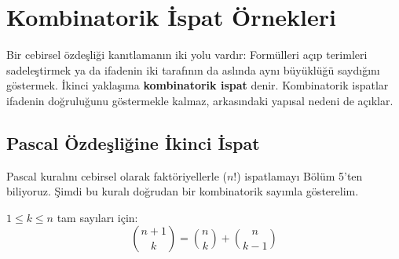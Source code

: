 \begin{center}
\end{center}

\section{Kombinatorik İspat Örnekleri}

Bir cebirsel özdeşliği kanıtlamanın iki yolu vardır: Formülleri açıp terimleri sadeleştirmek ya da ifadenin iki tarafının da aslında aynı büyüklüğü saydığını göstermek. İkinci yaklaşıma \textbf{kombinatorik ispat} denir. Kombinatorik ispatlar ifadenin doğruluğunu göstermekle kalmaz, arkasındaki yapısal nedeni de açıklar.

\subsection{Pascal Özdeşliğine İkinci İspat}

Pascal kuralını cebirsel olarak faktöriyellerle ($n!$) ispatlamayı Bölüm 5'ten biliyoruz. Şimdi bu kuralı doğrudan bir kombinatorik sayımla gösterelim.

\begin{theorem}
$1 \le k \le n$ tam sayıları için:
\[ \binom{n+1}{k} = \binom{n}{k} + \binom{n}{k-1} \]
\end{theorem}

